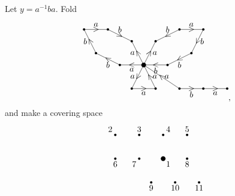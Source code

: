 \begin{example}
Let $ y = a^{-1}ba $. Fold
$$
\begin{tikzpicture}
\fill (0, 0) circle (0.1);
\fill (-0.5, -1) circle (0.05);
\fill (0.5, -1) circle (0.05);
\fill (-1, 0) circle (0.05);
\fill (-2, 0.5) circle (0.05);
\fill (-2.5, 1.5) circle (0.05);
\fill (-1.5, 1.5) circle (0.05);
\fill (-0.5, 1) circle (0.05);
\fill (0.5, 1) circle (0.05);
\fill (1.5, 1.5) circle (0.05);
\fill (2.5, 1.5) circle (0.05);
\fill (2, 0.5) circle (0.05);
\fill (1, 0) circle (0.05);
\fill (1.5, -1) circle (0.05);
\fill (2.5, -1) circle (0.05);
\fill (3.5, -1) circle (0.05);
\draw (0, 0) to node{\rotatebox{60}{$ < $}} node[left]{$ a $} (-0.5, -1);
\draw (-0.5, -1) to node{$ > $} node[below]{$ a $} (0.5, -1);
\draw (0.5, -1) to node{\rotatebox{30}{$ \wedge $}} node[right]{$ a $} (0, 0);
\draw (0, 0) to node{$ < $} node[below]{$ a $} (-1, 0);
\draw (-1, 0) to node{\rotatebox{60}{$ \wedge $}} node[below]{$ b $} (-2, 0.5);
\draw (-2, 0.5) to node{\rotatebox{30}{$ \wedge $}} node[left]{$ b $} (-2.5, 1.5);
\draw (-2.5, 1.5) to node{$ > $} node[above]{$ a $} (-1.5, 1.5);
\draw (-1.5, 1.5) to node{\rotatebox{60}{$ \vee $}} node[above]{$ b $} (-0.5, 1);
\draw (0, 0) to node{\rotatebox{30}{$ \wedge $}} node[left]{$ a $} (-0.5, 1);
\draw (0, 0) to node{\rotatebox{60}{$ > $}} node[right]{$ a $} (0.5, 1);
\draw (1.5, 1.5) to node{\rotatebox{30}{$ < $}} node[above]{$ b $} (0.5, 1);
\draw (1.5, 1.5) to node{$ > $} node[above]{$ a $} (2.5, 1.5);
\draw (2.5, 1.5) to node{\rotatebox{60}{$ < $}} node[right]{$ b $} (2, 0.5);
\draw (2, 0.5) to node{\rotatebox{30}{$ < $}} node[below]{$ b $} (1, 0);
\draw (1, 0) to node{$ < $} node[below]{$ b $} (0, 0);
\draw (1.5, -1) to node{\rotatebox{50}{$ \wedge $}} node[right]{$ a $} (0, 0);
\draw (1.5, -1) to node{$ > $} node[below]{$ b $} (2.5, -1);
\draw (2.5, -1) to node{$ > $} node[below]{$ a $} (3.5, -1);
\end{tikzpicture},
$$
and make a covering space
$$
\begin{tikzpicture}
\fill (0, 0) circle (0.1) node[below right]{$ 1 $};
\fill (-1, 0) circle (0.05) node[below left]{$ 7 $};
\fill (-0.5, -1) circle (0.05) node[below]{$ 9 $};
\fill (-2, 0) circle (0.05) node[below]{$ 6 $};
\fill (-2, 1) circle (0.05) node[above left]{$ 2 $};
\fill (-1, 1) circle (0.05) node[above]{$ 3 $};
\fill (0, 1) circle (0.05) node[above right]{$ 4 $};
\fill (1, 1) circle (0.05) node[above]{$ 5 $};
\fill (1, 0) circle (0.05) node[below]{$ 8 $};
\fill (0.5, -1) circle (0.05) node[below]{$ 10 $};
\fill (1.5, -1) circle (0.05) node[below]{$ 11 $};

\end{tikzpicture}$$
\end{example}
